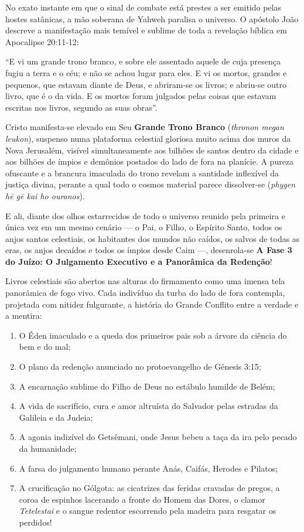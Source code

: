 No exato instante em que o sinal de combate está prestes a ser emitido pelas hostes satânicas, a mão soberana de Yahweh paralisa o universo.
O apóstolo João descreve a manifestação mais temível e sublime de toda a revelação bíblica em Apocalipse 20:11-12:

``E vi um grande trono branco, e sobre ele assentado aquele de cuja presença fugiu a terra e o céu; e não se achou lugar para eles. E vi os mortos, grandes e pequenos, que estavam diante de Deus, e abriram-se os livros; e abriu-se outro livro, que é o da vida. E os mortos foram julgados pelas coisas que estavam escritas nos livros, segundo as suas obras''.

Cristo manifesta-se elevado em Seu \textbf{Grande Trono Branco} (\textit{thronon megan leukon}), suspenso numa plataforma celestial gloriosa muito acima dos muros da Nova Jerusalém, visível simultaneamente aos bilhões de santos dentro da cidade e aos bilhões de ímpios e demônios postados do lado de fora na planície. A pureza ofuscante e a brancura imaculada do trono revelam a santidade inflexível da justiça divina, perante a qual todo o cosmos material parece dissolver-se (\textit{phygen hē gē kai ho ouranos}).

E ali, diante dos olhos estarrecidos de todo o universo reunido pela primeira e única vez em um mesmo cenário — o Pai, o Filho, o Espírito Santo, todos os anjos santos celestiais, os habitantes dos mundos não caídos, os salvos de todas as eras, os anjos decaídos e todos os ímpios desde Caim —, desenrola-se \textbf{A Fase 3 do Juízo: O Julgamento Executivo e a Panorâmica da Redenção}!

Livros celestiais são abertos nas alturas do firmamento como uma imensa tela panorâmica de fogo vivo.
Cada indivíduo da turba do lado de fora contempla, projetada com nitidez fulgurante, a história do Grande Conflito entre a verdade e a mentira:
\begin{enumerate}
  \item O Éden imaculado e a queda dos primeiros pais sob a árvore da ciência do bem e do mal;
  \item O plano da redenção anunciado no protoevangelho de Gênesis 3:15;
  \item A encarnação sublime do Filho de Deus no estábulo humilde de Belém;
  \item A vida de sacrifício, cura e amor altruísta do Salvador pelas estradas da Galileia e da Judeia;
  \item A agonia indizível do Getsêmani, onde Jesus bebeu a taça da ira pelo pecado da humanidade;
  \item A farsa do julgamento humano perante Anás, Caifás, Herodes e Pilatos;
  \item A crucificação no Gólgota: as cicatrizes das feridas cravadas de pregos, a coroa de espinhos lacerando a fronte do Homem das Dores, o clamor \textit{Tetelestai} e o sangue redentor escorrendo pela madeira para resgatar os perdidos!
\end{enumerate}


